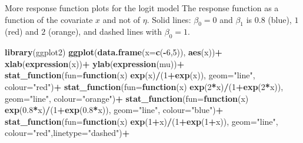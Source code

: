 \documentclass[
  ignorenonframetext,
]{beamer}
\newenvironment{Shaded}{\begin{snugshade}}{\end{snugshade}}
\newcommand{\AttributeTok}[1]{\textcolor[rgb]{0.13,0.29,0.53}{#1}}
\newcommand{\ControlFlowTok}[1]{\textcolor[rgb]{0.13,0.29,0.53}{\textbf{#1}}}
\newcommand{\DecValTok}[1]{\textcolor[rgb]{0.00,0.00,0.81}{#1}}
\newcommand{\FloatTok}[1]{\textcolor[rgb]{0.00,0.00,0.81}{#1}}
\newcommand{\FunctionTok}[1]{\textcolor[rgb]{0.13,0.29,0.53}{\textbf{#1}}}
\newcommand{\NormalTok}[1]{#1}
\newcommand{\SpecialCharTok}[1]{\textcolor[rgb]{0.81,0.36,0.00}{\textbf{#1}}}
\newcommand{\StringTok}[1]{\textcolor[rgb]{0.31,0.60,0.02}{#1}}
\begin{document}
\begin{frame}[fragile]
\begin{block}{More response function plots for the logit model}
\protect\hypertarget{more-response-function-plots-for-the-logit-model}{}
The response function as a function of the covariate \(x\) and not of
\(\eta\). Solid lines: \(\beta_0=0\) and \(\beta_1\) is \(0.8\) (blue),
\(1\) (red) and \(2\) (orange), and dashed lines with \(\beta_0=1\).

\begin{Shaded}
\begin{Highlighting}[]
\FunctionTok{library}\NormalTok{(ggplot2)}
\FunctionTok{ggplot}\NormalTok{(}\FunctionTok{data.frame}\NormalTok{(}\AttributeTok{x=}\FunctionTok{c}\NormalTok{(}\SpecialCharTok{{-}}\DecValTok{6}\NormalTok{,}\DecValTok{5}\NormalTok{)), }\FunctionTok{aes}\NormalTok{(x))}\SpecialCharTok{+}
  \FunctionTok{xlab}\NormalTok{(}\FunctionTok{expression}\NormalTok{(x))}\SpecialCharTok{+} 
  \FunctionTok{ylab}\NormalTok{(}\FunctionTok{expression}\NormalTok{(mu))}\SpecialCharTok{+}
    \FunctionTok{stat\_function}\NormalTok{(}\AttributeTok{fun=}\ControlFlowTok{function}\NormalTok{(x) }\FunctionTok{exp}\NormalTok{(x)}\SpecialCharTok{/}\NormalTok{(}\DecValTok{1}\SpecialCharTok{+}\FunctionTok{exp}\NormalTok{(x)), }\AttributeTok{geom=}\StringTok{"line"}\NormalTok{, }\AttributeTok{colour=}\StringTok{"red"}\NormalTok{)}\SpecialCharTok{+}
    \FunctionTok{stat\_function}\NormalTok{(}\AttributeTok{fun=}\ControlFlowTok{function}\NormalTok{(x) }\FunctionTok{exp}\NormalTok{(}\DecValTok{2}\SpecialCharTok{*}\NormalTok{x)}\SpecialCharTok{/}\NormalTok{(}\DecValTok{1}\SpecialCharTok{+}\FunctionTok{exp}\NormalTok{(}\DecValTok{2}\SpecialCharTok{*}\NormalTok{x)), }\AttributeTok{geom=}\StringTok{"line"}\NormalTok{, }\AttributeTok{colour=}\StringTok{"orange"}\NormalTok{)}\SpecialCharTok{+}
          \FunctionTok{stat\_function}\NormalTok{(}\AttributeTok{fun=}\ControlFlowTok{function}\NormalTok{(x) }\FunctionTok{exp}\NormalTok{(}\FloatTok{0.8}\SpecialCharTok{*}\NormalTok{x)}\SpecialCharTok{/}\NormalTok{(}\DecValTok{1}\SpecialCharTok{+}\FunctionTok{exp}\NormalTok{(}\FloatTok{0.8}\SpecialCharTok{*}\NormalTok{x)), }\AttributeTok{geom=}\StringTok{"line"}\NormalTok{, }\AttributeTok{colour=}\StringTok{"blue"}\NormalTok{)}\SpecialCharTok{+}
    \FunctionTok{stat\_function}\NormalTok{(}\AttributeTok{fun=}\ControlFlowTok{function}\NormalTok{(x) }\FunctionTok{exp}\NormalTok{(}\DecValTok{1}\SpecialCharTok{+}\NormalTok{x)}\SpecialCharTok{/}\NormalTok{(}\DecValTok{1}\SpecialCharTok{+}\FunctionTok{exp}\NormalTok{(}\DecValTok{1}\SpecialCharTok{+}\NormalTok{x)), }\AttributeTok{geom=}\StringTok{"line"}\NormalTok{, }\AttributeTok{colour=}\StringTok{"red"}\NormalTok{,}\AttributeTok{linetype=}\StringTok{"dashed"}\NormalTok{)}\SpecialCharTok{+}

\end{Highlighting}
\end{Shaded}
\end{block}
\end{frame}
\end{document}
